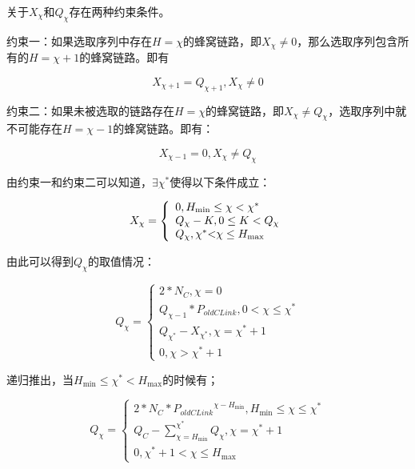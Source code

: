 \documentclass[figurelist,tablelist,algorithmlist,nomlist,masters]{seuthesix}
\begin{document}
	关于$X_{\chi }$和$Q_{\chi }$存在两种约束条件。
	
	约束一：如果选取序列中存在$H = \chi $的蜂窝链路，即$X_\chi \ne 0$，那么选取序列包含所有的$H = \chi + 1$的蜂窝链路。即有
	
	\begin{equation}\label{eq3.1}
	X_{\chi  + 1} = Q_{\chi  + 1},X_\chi \ne 0
	\end{equation}
	
	
	约束二：如果未被选取的链路存在$H = \chi $的蜂窝链路，即$X_{\chi } \ne Q_{\chi }$，选取序列中就不可能存在$H = \chi - 1$的蜂窝链路。即有：
	
	\begin{equation}\label{eq3.1}
	X_{\chi  - 1} = 0,X_{\chi } \ne Q_{\chi }
	\end{equation}
	
	由约束一和约束二可以知道，$\exists \chi ^*$使得以下条件成立：
	
	
	\begin{equation}\label{eq3.1}
	{X_\chi } = \left\{ \begin{array}{l}
	0,{H_{\min }} \le \chi  < {\chi ^*}\\
	{Q_\chi } - K,0 \le K < {Q_\chi }\\
	{Q_\chi },{\chi ^*}{\rm{ <  }}\chi  \le {H_{\max }}
	\end{array} \right.
	\end{equation}
	
	由此可以得到$Q_{\chi}$的取值情况：
	
	\begin{equation}\label{eq3.1}
	Q_{\chi } = \left\{ \begin{array}{l}
	2*N_C,\chi = 0\\
	Q_{\chi - 1}*{P_{oldCLink}},0 < \chi  \le \chi ^*\\
	Q_{\chi ^*} - X_{\chi ^*},\chi  = \chi ^* + 1\\
	0,\chi  > \chi ^* + 1
	\end{array} \right.
	\end{equation}
	
	递归推出，当$H_{\min } \le \chi ^* < H_{\max }$的时候有；
	
	\begin{equation}\label{eq3.1}
	Q_\chi  = \left\{ \begin{array}{l}
	2*N_C*{P_{oldCLink}}^{\chi - H_{\min }},H_{\min } \le \chi  \le \chi ^*\\
	Q_C - \sum\limits_{\chi = H_{\min }}^{\chi ^*} {Q_{\chi }} ,\chi  = {\chi ^* + 1}\\
	0,\chi ^* + 1 < \chi  \le {H_{\max }}
	\end{array} \right.
	\end{equation}
	
\end{document}
